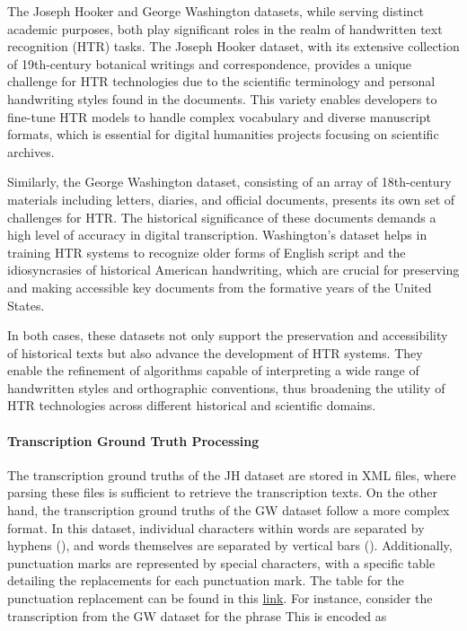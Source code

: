The Joseph Hooker and George Washington datasets, while serving distinct academic purposes, both play significant roles in the realm of handwritten text recognition (HTR) tasks. The Joseph Hooker dataset, with its extensive collection of 19th-century botanical writings and correspondence, provides a unique challenge for HTR technologies due to the scientific terminology and personal handwriting styles found in the documents. This variety enables developers to fine-tune HTR models to handle complex vocabulary and diverse manuscript formats, which is essential for digital humanities projects focusing on scientific archives.

Similarly, the George Washington dataset, consisting of an array of 18th-century materials including letters, diaries, and official documents, presents its own set of challenges for HTR. The historical significance of these documents demands a high level of accuracy in digital transcription. Washington's dataset helps in training HTR systems to recognize older forms of English script and the idiosyncrasies of historical American handwriting, which are crucial for preserving and making accessible key documents from the formative years of the United States.

In both cases, these datasets not only support the preservation and accessibility of historical texts but also advance the development of HTR systems. They enable the refinement of algorithms capable of interpreting a wide range of handwritten styles and orthographic conventions, thus broadening the utility of HTR technologies across different historical and scientific domains.

\paragraph*{Transcription Ground Truth Processing}
\label{par:3_transcription_gound_truth_processing}
The transcription ground truths of the JH dataset are stored in XML files, where parsing these files is sufficient to retrieve the transcription texts. On the other hand, the transcription ground truths of the GW dataset follow a more complex format. In this dataset, individual characters within words are separated by hyphens (\say{ - }), and words themselves are separated by vertical bars (\say{ \textbar \;}). Additionally, punctuation marks are represented by special characters, with a specific table detailing the replacements for each punctuation mark. The table for the punctuation replacement can be found in this \href{https://github.com/Yung-Hsin-Chen/master_thesis/blob/src/model/config/punctuation_list.json}{link}. For instance, consider the transcription from the GW dataset for the phrase  This is encoded as 


